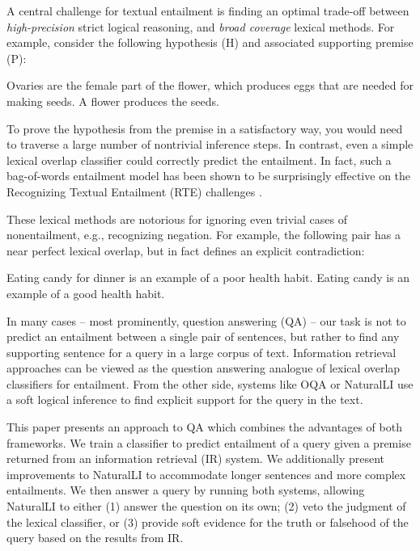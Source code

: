 A central challenge for textual entailment is finding an optimal trade-off between
  \textit{high-precision} strict logical reasoning, and \textit{broad coverage}
  lexical methods.
For example, consider the following hypothesis (H) and associated supporting premise (P):

\entailmentExample
{Ovaries are the female part of the flower, which produces eggs that are needed for making seeds.}
{A flower produces the seeds.}

To prove the hypothesis from the premise in a satisfactory way, you would need
  to traverse a large number of nontrivial inference steps.
In contrast, even a simple lexical overlap classifier could correctly predict
  the entailment.
In fact, such a bag-of-words entailment model has been shown to be surprisingly
  effective on the Recognizing Textual Entailment (RTE) challenges 
  \cite{key:2009maccartney-thesis}.

These lexical methods are notorious for ignoring even trivial cases of nonentailment,
  e.g., recognizing negation.
For example, the following pair has a near perfect lexical overlap, but in fact defines
  an explicit contradiction:

\entailmentExample
{Eating candy for dinner is an example of a poor health habit.}
{Eating candy is an example of a good health habit.}

In many cases -- most prominently, question answering (QA) -- our task is not to predict
  an entailment between a single pair of sentences, but rather to find any
  supporting sentence for a query in a large corpus of text.
Information retrieval approaches can be viewed as the question answering analogue 
  of lexical overlap classifiers for entailment.
From the other side, systems like OQA \cite{key:2014fader-openqa} or
  NaturalLI \cite{key:2014angeli-naturalli} use a soft logical inference to
  find explicit support for the query in the text.

This paper presents an approach to QA which combines the advantages of both
  frameworks.
We train a classifier to predict entailment of a query given a premise returned
  from an information retrieval (IR) system.
We additionally present improvements to NaturalLI to accommodate
  longer sentences and more complex entailments.
We then answer a query by running both systems, allowing NaturalLI to either
  (1) answer the question on its own; (2) veto the judgment of the lexical
  classifier, or (3) provide soft evidence for the truth or falsehood of the
  query based on the results from IR.

